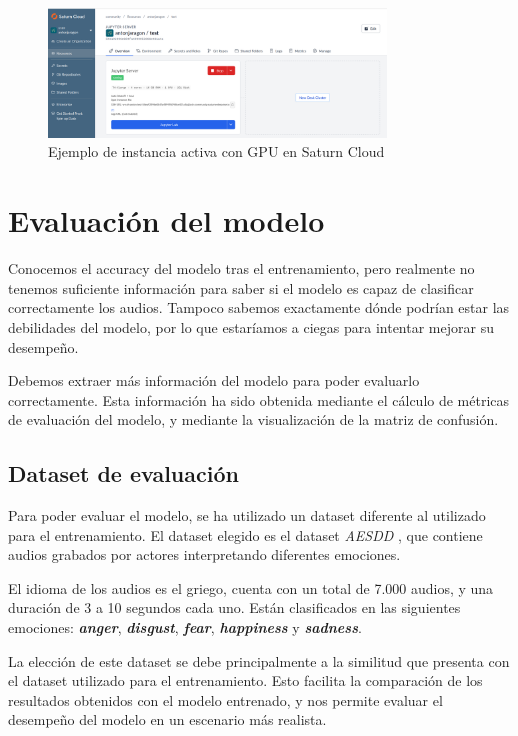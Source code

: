 \begin{figure}[htpb]
    \centering
    \includegraphics[width=0.8\textwidth]{cap2/images/saturn-cloud.png}
    \caption{Ejemplo de instancia activa con GPU en Saturn Cloud}
    \label{fig:saturn-cloud}
    
\end{figure}


\section{Evaluación del modelo}\label{seccion:evaluacion-del-modelo}
Conocemos el accuracy del modelo tras el entrenamiento, pero realmente no tenemos suficiente información para saber si el modelo es capaz de clasificar correctamente los audios.
Tampoco sabemos exactamente dónde podrían estar las debilidades del modelo, por lo que estaríamos a ciegas para intentar mejorar su desempeño.

Debemos extraer más información del modelo para poder evaluarlo correctamente.
Esta información ha sido obtenida mediante el cálculo de métricas de evaluación del modelo, y mediante la visualización de la matriz de confusión.

\subsection{Dataset de evaluación}\label{seccion:dataset-de-evaluacion}
Para poder evaluar el modelo, se ha utilizado un dataset diferente al utilizado para el entrenamiento.
El dataset elegido es el dataset \textit{AESDD} \cite{AESDD_1}\cite{AESDD_2}, que contiene audios grabados por actores interpretando diferentes emociones.

El idioma de los audios es el griego, cuenta con un total de 7.000 audios, y una duración de 3 a 10 segundos cada uno.
Están clasificados en las siguientes emociones: \textit{\textbf{anger}}, \textit{\textbf{disgust}}, \textit{\textbf{fear}}, \textit{\textbf{happiness}} y \textit{\textbf{sadness}}.

La elección de este dataset se debe principalmente a la similitud que presenta con el dataset utilizado para el entrenamiento.
Esto facilita la comparación de los resultados obtenidos con el modelo entrenado, y nos permite evaluar el desempeño del modelo en un escenario más realista.

